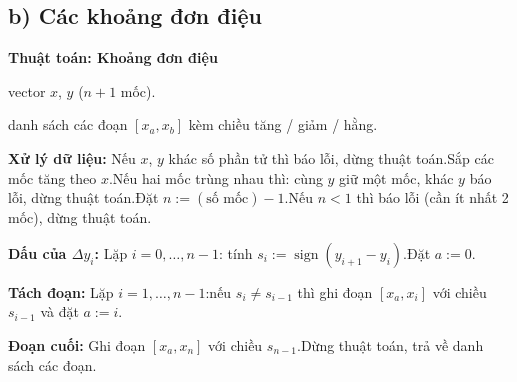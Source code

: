 \documentclass[11pt,a4paper]{article}
\newenvironment{thuattoan}[1]
  {\par\medskip\noindent\textbf{Thuật toán: #1}\begin{description}[style=standard,align=left,leftmargin=4.3em,labelwidth=3.9em,labelsep=0.4em,itemsep=1pt,topsep=3pt,font=\normalfont\bfseries]}
  {\end{description}}
\newcommand{\thut}{\newline\hspace*{1.2em}}
\begin{document}
\subsection{b) Các khoảng đơn điệu}
\begin{thuattoan}{Khoảng đơn điệu}
\item[Input:] vector $x$, $y$ ($n+1$ mốc).
\item[Output:] danh sách các đoạn $[x_a,x_b]$ kèm chiều tăng / giảm / hằng.
\item[Bước 0:] \textbf{Xử lý dữ liệu:} Nếu $x$, $y$ khác số phần tử thì báo lỗi, dừng thuật toán.\newline Sắp các mốc tăng theo $x$.\newline Nếu hai mốc trùng nhau thì: cùng $y$ giữ một mốc, khác $y$ báo lỗi, dừng thuật toán.\newline Đặt $n:=(\text{số mốc})-1$.\newline Nếu $n<1$ thì báo lỗi (cần ít nhất 2 mốc), dừng thuật toán.
\item[Bước 1:] \textbf{Dấu của $\Delta y_i$:} Lặp $i=0,\dots,n-1$: tính $s_i:=\operatorname{sign}(y_{i+1}-y_i)$.\newline Đặt $a:=0$.
\item[Bước 2:] \textbf{Tách đoạn:} Lặp $i=1,\dots,n-1$:\thut nếu $s_i\ne s_{i-1}$ thì ghi đoạn $[x_a,x_i]$ với chiều $s_{i-1}$ và đặt $a:=i$.
\item[Bước 3:] \textbf{Đoạn cuối:} Ghi đoạn $[x_a,x_n]$ với chiều $s_{n-1}$.\newline Dừng thuật toán, trả về danh sách các đoạn.
\end{thuattoan}
\end{document}
